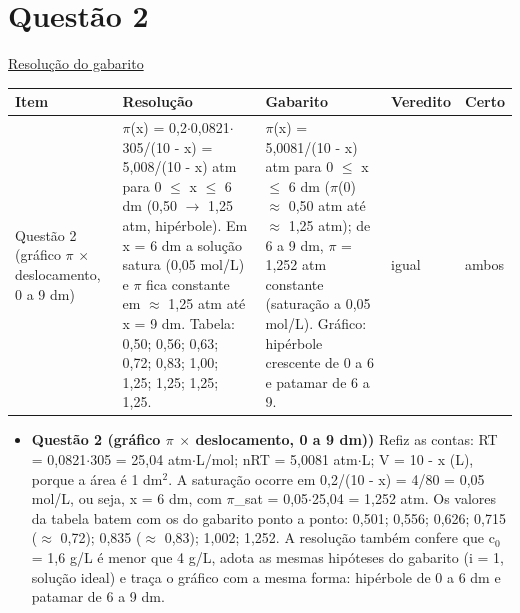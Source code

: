 \documentclass{article}%
\begin{document}
\section*{Questão 2}%
\href{https://poliedroresolve.sistemapoliedro.com.br/vestibulares/ita/2027/ita-2-fase-dia-2-21-10-2026-2-fase-dia-2/dissertativa-2-quimica-2-fase-dia-2-ita-2027}{Resolução do gabarito}\par\smallskip%
\begin{longtable}{@{}p{} p{} p{} p{} p{}@{}}\toprule Item & Resolução & Gabarito & Veredito & Certo \\ \midrule
Questão 2 (gráfico $\pi$ $\times$ deslocamento, 0 a 9 dm) & $\pi$(x) = 0,2$\cdot$0,0821$\cdot$305/(10 - x) = 5,008/(10 - x) atm para 0 $\leq$ x $\leq$ 6 dm (0,50 $\to$ 1,25 atm, hipérbole). Em x = 6 dm a solução satura (0,05 mol/L) e $\pi$ fica constante em $\approx$ 1,25 atm até x = 9 dm. Tabela: 0,50; 0,56; 0,63; 0,72; 0,83; 1,00; 1,25; 1,25; 1,25; 1,25. & $\pi$(x) = 5,0081/(10 - x) atm para 0 $\leq$ x $\leq$ 6 dm ($\pi$(0) $\approx$ 0,50 atm até $\approx$ 1,25 atm); de 6 a 9 dm, $\pi$ = 1,252 atm constante (saturação a 0,05 mol/L). Gráfico: hipérbole crescente de 0 a 6 e patamar de 6 a 9. & igual & ambos \\
\bottomrule\end{longtable}%
\begin{itemize}%
\item%
\textbf{Questão 2 (gráfico $\pi$ $\times$ deslocamento, 0 a 9 dm))} Refiz as contas: RT = 0,0821$\cdot$305 = 25,04 atm$\cdot$L/mol; nRT = 5,0081 atm$\cdot$L; V = 10 - x (L), porque a área é 1 dm$^2$. A saturação ocorre em 0,2/(10 - x) = 4/80 = 0,05 mol/L, ou seja, x = 6 dm, com $\pi$\_sat = 0,05$\cdot$25,04 = 1,252 atm. Os valores da tabela batem com os do gabarito ponto a ponto: 0,501; 0,556; 0,626; 0,715 ($\approx$ 0,72); 0,835 ($\approx$ 0,83); 1,002; 1,252. A resolução também confere que c$_{0}$ = 1,6 g/L é menor que 4 g/L, adota as mesmas hipóteses do gabarito (i = 1, solução ideal) e traça o gráfico com a mesma forma: hipérbole de 0 a 6 dm e patamar de 6 a 9 dm.%
\end{itemize}%
\end{document}
